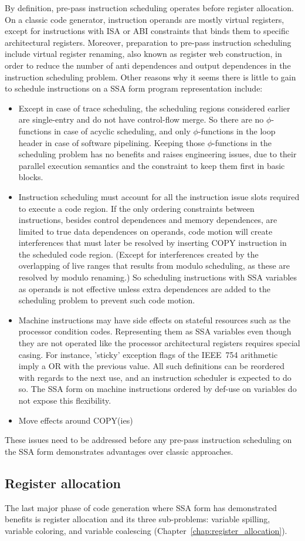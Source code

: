 By definition, pre-pass instruction scheduling operates before register
allocation. On a classic code generator, instruction operands are mostly virtual
registers, except for instructions with ISA or ABI constraints that binds them
to specific architectural registers. Moreover, preparation to pre-pass
instruction scheduling include virtual register renaming, also known as register
web construction, in order to reduce the number of anti dependences and output
dependences in the instruction scheduling problem. Other reasons why it seems
there is little to gain to schedule instructions on a SSA form program
representation include: \begin{itemize}

\item Except in case of trace scheduling, the scheduling regions considered
earlier are single-entry and do not have control-flow merge. So there are no
$\phi$-functions in case of acyclic scheduling, and only $\phi$-functions in the
loop header in case of software pipelining. Keeping those $\phi$-functions in
the scheduling problem has no benefits and raises engineering issues, due to
their parallel execution semantics and the constraint to keep them first in
basic blocks.

\item Instruction scheduling must account for all the instruction issue slots
required to execute a code region. If the only ordering constraints between
instructions, besides control dependences and memory dependences, are limited to
true data dependences on operands, code motion will create interferences that
must later be resolved by inserting COPY instruction in the scheduled code
region. (Except for interferences created by the overlapping of live ranges
that results from modulo scheduling, as these are resolved by modulo renaming.)
So scheduling instructions with SSA variables as operands is not effective
unless extra dependences are added to the scheduling problem to prevent such
code motion. 

\item Machine instructions may have side effects on stateful resources such as
the processor condition codes. Representing them as SSA variables even though
they are not operated like the processor architectural registers requires
special casing. For instance, 'sticky' exception flags of the IEEE~754
arithmetic imply a OR with the previous value. All such definitions can be
reordered with regards to the next use, and an instruction scheduler is expected
to do so. The SSA form on machine instructions ordered by def-use on variables
do not expose this flexibility.

\item Move effects around COPY(ies) 

\end{itemize} These issues need to be addressed before any pre-pass instruction
scheduling on the SSA form demonstrates advantages over classic approaches.

\subsection{Register allocation}

The last major phase of code generation where SSA form has demonstrated benefits
is register allocation and its three sub-problems: variable spilling, variable
coloring, and variable coalescing (Chapter~\ref{chap:register_allocation}).


